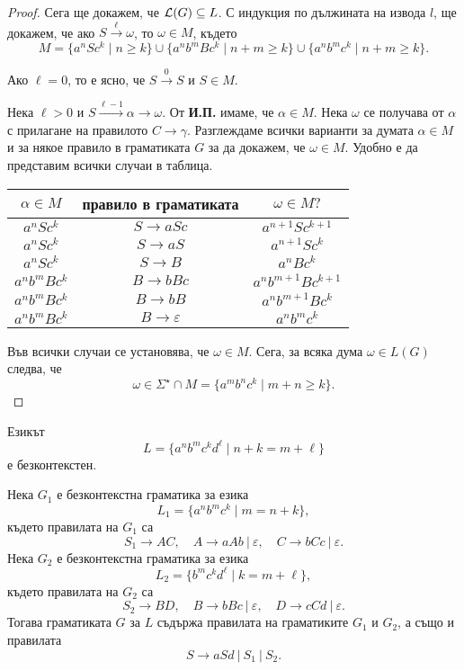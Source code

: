 \begin{proof}
  Сега ще докажем, че $\mathcal{L}(G) \subseteq L$.
  С индукция по дължината на извода $l$,
  ще докажем, че ако $S \stackrel{\ell}{\rightarrow}\omega$, то $\omega \in M$, където
  \[M = \{a^nSc^k\mid n\geq k\}\cup\{a^nb^mBc^k\mid n+m\geq k\}\cup\{a^nb^mc^k\mid n+m\geq k\}.\]
  
  Ако $\ell = 0$, то е ясно, че $S \stackrel{0}{\rightarrow} S$ и $S \in M$.

  Нека $\ell > 0$ и $S \stackrel{\ell-1}{\rightarrow} \alpha \rightarrow \omega$.
  От {\bf И.П.} имаме, че $\alpha \in M$. Нека $\omega$ се получава от $\alpha$ с прилагане на правилото $C \rightarrow \gamma$.
  Разглеждаме всички варианти за думата $\alpha \in M$ и за някое правило в граматиката $G$
  за да докажем, че  $\omega \in M$.
  Удобно е да представим всички случаи в таблица.
  \begin{center}
    \begin{tabular}{| c | c | c |}
      \hline
      $\alpha\in M$ & правило в граматиката & $\omega \in M?$ \\ \hline
      $a^nSc^k$ & $S \rightarrow aSc$ & $a^{n+1}Sc^{k+1}$ \\ \hline
      $a^nSc^k$ & $S \rightarrow aS$ & $a^{n+1}Sc^{k}$ \\ \hline
      $a^nSc^k$ & $S \rightarrow B$ & $a^{n}Bc^{k}$ \\ \hline
      $a^nb^mBc^k$ & $B \rightarrow bBc$ & $a^nb^{m+1}Bc^{k+1}$\\ \hline
      $a^nb^mBc^k$ & $B \rightarrow bB$ & $a^nb^{m+1}Bc^{k}$\\ \hline
      $a^nb^mBc^k$ & $B \rightarrow \varepsilon$ & $a^nb^{m}c^{k}$\\ \hline
    \end{tabular}
  \end{center}
  Във всички случаи се установява, че $\omega \in M$.
  Сега, за всяка дума $\omega \in L(G)$ следва, че
  \[\omega \in \Sigma^\star \cap M = \{a^mb^nc^k\mid m+n \geq k\}.\]
\end{proof}

\begin{example}
  Езикът 
  \[L = \{a^nb^mc^kd^\ell \mid n+k = m + \ell\}\]
  е безконтекстен.
\end{example}
\begin{hint}
  Нека $G_1$ е безконтекстна граматика за езика
  \[L_1 = \{a^nb^mc^k \mid m = n+k\},\]
  където правилата на $G_1$ са
  \[S_1 \to AC,\quad  A \to aAb\ |\ \varepsilon,\quad C \to bCc\ |\ \varepsilon.\]
  Нека $G_2$ е безконтекстна граматика за езика 
  \[L_2 = \{b^mc^kd^\ell \mid k = m+\ell\},\]
  където правилата на $G_2$ са
  \[S_2 \to BD,\quad B \to bBc\ |\ \varepsilon,\quad D \to cCd\ |\ \varepsilon.\]
  Тогава граматиката $G$ за $L$ 
  съдържа правилата на граматиките $G_1$ и $G_2$, а също и правилата
  \[S \to aSd\ |\ S_1\ |\ S_2.\]
\end{hint}

